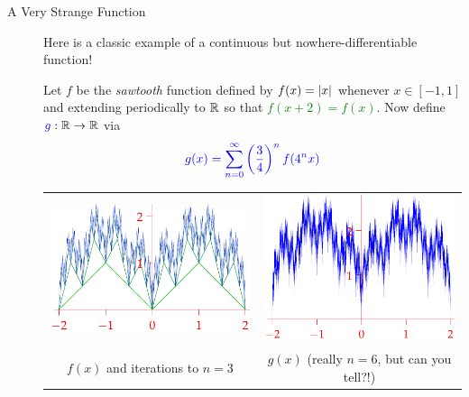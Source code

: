    \vfill
   
	\goodbreak
	
	\begin{tcolorbox}[exercisestyle,title={}]
\begin{description}
   \item[A Very Strange Function]\label{strangefunction}\phantom{bob}\smallbreak
   
   Here is a classic example of a continuous but nowhere-differentiable function!\smallbreak

Let $f$ be the \emph{sawtooth} function defined by \textcolor{Green}{$f(x)=\left| x\right|$} whenever $x\in[-1,1]$ and extending periodically to $\mathbb{R}$ so that \textcolor{Green}{$f(x+2)=f(x)$}. Now define $\textcolor{blue}{g}:\mathbb{R}\to\mathbb{R}$ via
  \[\textcolor{blue}{g(x)=\sum_{n=0}^\infty \left(\frac 34\right)^nf(4^nx)}\]
  \vspace{-30pt}
  \begin{center}
  \begin{tabular}{c@{\qquad}c}
  \includegraphics{sawtooth}&\includegraphics{sawtooth2}\\
  $f(x)$ and iterations to $n=3$
  &$g(x)$ (really $n=6$, but can you tell?!)
  \end{tabular}
  \end{center}
  

\end{description}
\end{tcolorbox}

